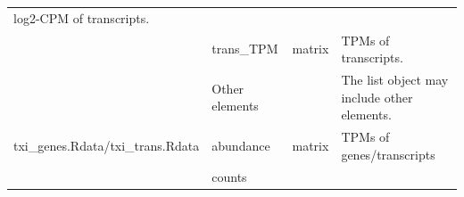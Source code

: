 \documentclass[]{article}
\begin{document}
\begin{longtable}[]{@{}llll@{}}
\begin{minipage}[t]{0.71\columnwidth}
log2-CPM of transcripts.\strut
\end{minipage}\tabularnewline
\begin{minipage}[t]{0.08\columnwidth}\raggedright\strut
\strut
\end{minipage} & \begin{minipage}[t]{0.06\columnwidth}\raggedright\strut
trans\_TPM\strut
\end{minipage} & \begin{minipage}[t]{0.04\columnwidth}\raggedright\strut
matrix\strut
\end{minipage} & \begin{minipage}[t]{0.71\columnwidth}\raggedright\strut
TPMs of transcripts.\strut
\end{minipage}\tabularnewline
\begin{minipage}[t]{0.08\columnwidth}\raggedright\strut
\strut
\end{minipage} & \begin{minipage}[t]{0.06\columnwidth}\raggedright\strut
Other elements\strut
\end{minipage} & \begin{minipage}[t]{0.04\columnwidth}\raggedright\strut
\strut
\end{minipage} & \begin{minipage}[t]{0.71\columnwidth}\raggedright\strut
The list object may include other elements.\strut
\end{minipage}\tabularnewline
\begin{minipage}[t]{0.08\columnwidth}\raggedright\strut
txi\_genes.Rdata/txi\_trans.Rdata\strut
\end{minipage} & \begin{minipage}[t]{0.06\columnwidth}\raggedright\strut
abundance\strut
\end{minipage} & \begin{minipage}[t]{0.04\columnwidth}\raggedright\strut
matrix\strut
\end{minipage} & \begin{minipage}[t]{0.71\columnwidth}\raggedright\strut
TPMs of genes/transcripts\strut
\end{minipage}\tabularnewline
\begin{minipage}[t]{0.08\columnwidth}\raggedright\strut
\strut
\end{minipage} & \begin{minipage}[t]{0.06\columnwidth}\raggedright\strut
counts\strut
\end{minipage} & \begin{minipage}[t]{0.04\columnwidth}\raggedright\strut

\end{minipage}
\end{longtable}
\end{document}
